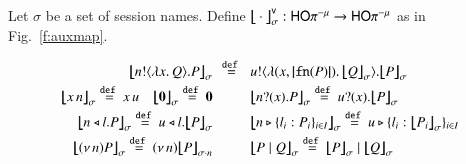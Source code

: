 \begin{definition}\label{d:trabs}\label{d:auxmap}
	Let $\sigma$ be a set of session names.
	Define $\big\lfloor\!\!\big\lfloor\cdot\big\rfloor\!\!\big\rfloor^\mathsf{v}_\sigma: \mathsf{HO}\pi^{-\mu} \to \mathsf{HO}\pi^{-\mu}$ as in Fig.~\ref{f:auxmap}.
%
\begin{figure}[t]
\[
\small
\begin{array}{rcl}
	\auxmapp{\bout{n}{\abs{x}{Q}} P}{{}}{\sigma} &\!\!\defeq\!\!&
		\bout{u}{\abs{(x,\vmap{\fn{P}})}{\auxmapp{Q}{{}}{\sigma}}} \auxmapp{P}{{}}{\sigma}
\\[1mm]
	\auxmapp{\appl{x}{n}}{{}}{\sigma}  \defeq
		\appl{x}{u} \quad 
	\auxmapp{\inact}{{}}{\sigma}  \defeq  \inact
& & 
			\auxmapp{\binp{n}{x} P}{{}}{\sigma}\defeq
		\binp{u}{x} \auxmapp{P}{{}}{\sigma} 
\\[1mm]
	\auxmapp{\bsel{n}{l} P}{{}}{\sigma} \defeq
		\bsel{u}{l} \auxmapp{P}{{}}{\sigma} 
& & 
	\auxmapp{\bbra{n}{l_i:P_i}_{i \in I}}{{}}{\sigma}  \defeq 
		\bbra{u}{l_i:\auxmapp{P_i}{{}}{\sigma}}_{i \in I}
	\vspace{1mm} \\
\auxmapp{\news{n} P}{{}}{\sigma}  \defeq  \news{n} \auxmapp{P}{{}}{{\sigma \cat n}}
& & 
	\auxmapp{P \Par Q}{{}}{\sigma}  \defeq  \auxmapp{P}{{}}{\sigma} \Par \auxmapp{Q}{{}}{\sigma} 
\end{array}
\]

\end{figure}
\end{definition}
